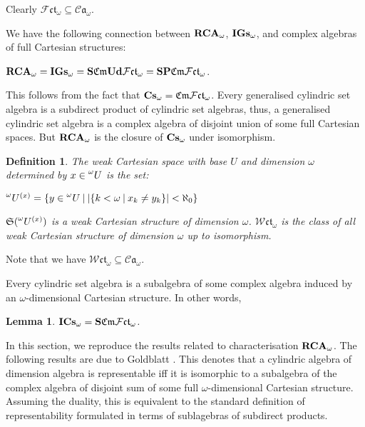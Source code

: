 \documentclass[a4paper]{article}
\theoremstyle{defin}
\newtheorem{defin}{Definition}
\theoremstyle{theorem}
\theoremstyle{claim}
\theoremstyle{prop}
\theoremstyle{lemma}
\newtheorem{lemma}{Lemma}
\theoremstyle{fact}
\theoremstyle{ex}
\theoremstyle{col}
\begin{document}
Clearly $\mathcal{F} \mathfrak{c}\mathfrak{t}_{\omega} \subseteq \mathcal{C}\mathfrak{a}_{\omega}$.

We have the following connection between ${\bf RCA}_{\omega}$, ${\bf IGs}_{\omega}$, and complex algebras of full Cartesian structures:
\begin{center}
${\bf RCA}_{\omega} = {\bf IGs}_{\omega} = {\bf S} \mathfrak{Cm} {\bf Ud} \mathcal{F} \mathfrak{c}\mathfrak{t}_{\omega} = {\bf S P} \mathfrak{Cm}  \mathcal{F} \mathfrak{c}\mathfrak{t}_{\omega}$.
\end{center}
This follows from the fact that ${\bf Cs}_{\omega} = \mathfrak{Cm} \mathcal{F} \mathfrak{c}\mathfrak{t}_{\omega}$. Every generalised cylindric set algebra is a subdirect product of cylindric set algebras, thus, a generalised cylindric set algebra is a complex algebra of disjoint union of some full Cartesian spaces. But ${\bf RCA}_{\omega}$ is the closure of ${\bf Cs}_{\omega}$ under isomorphism.

\begin{defin}
The weak Cartesian space with base $U$ and dimension $\omega$ determined by $x \in \prescript{\omega}{}U$ is the set:
\begin{center}
$\prescript{\omega}{}U^{(x)} = \{ y \in \prescript{\omega}{}U \: | \: |\{ k < \omega \: | \: x_k \neq y_k \}| < \aleph_0 \}$
\end{center}
$\mathfrak{S}(\prescript{\omega}{}U^{(x)})$ is a weak Cartesian structure of dimension $\omega$. $\mathcal{W} \mathfrak{ct}_{\omega}$ is the class of all weak Cartesian structure of dimension $\omega$ up to isomorphism.
\end{defin}
Note that we have $\mathcal{W} \mathfrak{ct}_{\omega} \subseteq \mathcal{C}\mathfrak{a}_{\omega}$.

Every cylindric set algebra is a subalgebra of some complex algebra induced by an $\omega$-dimensional Cartesian structure. In other words,

\begin{lemma}
${\bf I}{\bf Cs}_{\omega} = {\bf S} \mathfrak{Cm} \mathcal{F} \mathfrak{c}\mathfrak{t}_{\omega}$.
\end{lemma}


In this section, we reproduce the results related to characterisation ${\bf RCA}_{\omega}$. The following results are due to Goldblatt \cite{goldblatt1995elementary}. This denotes that a cylindric algebra of dimension algebra is representable iff it is isomorphic to a subalgebra of the complex algebra of disjoint sum of some full $\omega$-dimensional Cartesian structure. Assuming the duality, this is equivalent to the standard definition of representability formulated in terms of sublagebras of subdirect products.
\end{document}
